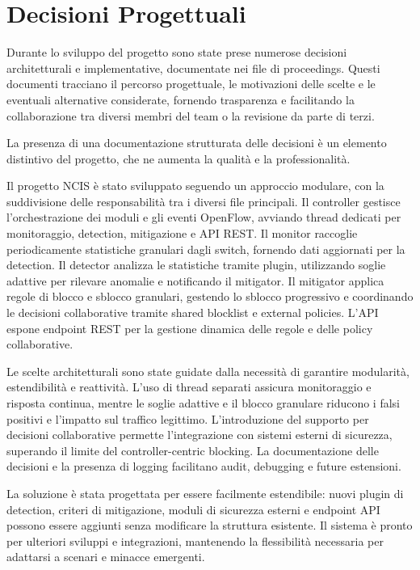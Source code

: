 \section{Decisioni Progettuali}
Durante lo sviluppo del progetto sono state prese numerose decisioni architetturali e implementative, documentate nei file di proceedings. Questi documenti tracciano il percorso progettuale, le motivazioni delle scelte e le eventuali alternative considerate, fornendo trasparenza e facilitando la collaborazione tra diversi membri del team o la revisione da parte di terzi.\par
La presenza di una documentazione strutturata delle decisioni è un elemento distintivo del progetto, che ne aumenta la qualità e la professionalità.

Il progetto NCIS è stato sviluppato seguendo un approccio modulare, con la suddivisione delle responsabilità tra i diversi file principali. Il controller gestisce l'orchestrazione dei moduli e gli eventi OpenFlow, avviando thread dedicati per monitoraggio, detection, mitigazione e API REST. Il monitor raccoglie periodicamente statistiche granulari dagli switch, fornendo dati aggiornati per la detection. Il detector analizza le statistiche tramite plugin, utilizzando soglie adattive per rilevare anomalie e notificando il mitigator. Il mitigator applica regole di blocco e sblocco granulari, gestendo lo sblocco progressivo e coordinando le decisioni collaborative tramite shared blocklist e external policies. L'API espone endpoint REST per la gestione dinamica delle regole e delle policy collaborative.\par
Le scelte architetturali sono state guidate dalla necessità di garantire modularità, estendibilità e reattività. L'uso di thread separati assicura monitoraggio e risposta continua, mentre le soglie adattive e il blocco granulare riducono i falsi positivi e l'impatto sul traffico legittimo. L'introduzione del supporto per decisioni collaborative permette l'integrazione con sistemi esterni di sicurezza, superando il limite del controller-centric blocking. La documentazione delle decisioni e la presenza di logging facilitano audit, debugging e future estensioni.\par
La soluzione è stata progettata per essere facilmente estendibile: nuovi plugin di detection, criteri di mitigazione, moduli di sicurezza esterni e endpoint API possono essere aggiunti senza modificare la struttura esistente. Il sistema è pronto per ulteriori sviluppi e integrazioni, mantenendo la flessibilità necessaria per adattarsi a scenari e minacce emergenti.
